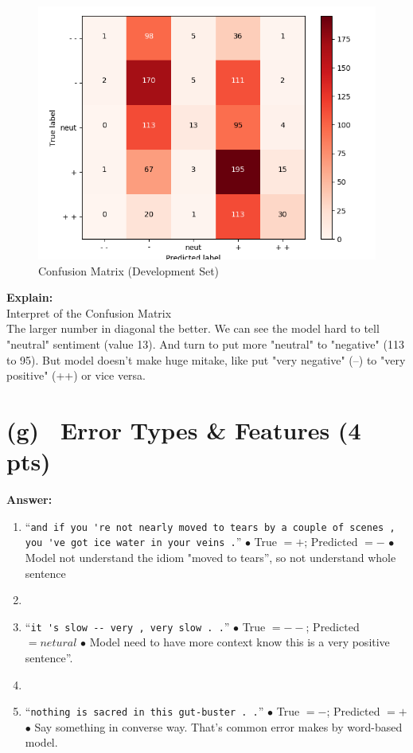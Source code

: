\documentclass[fleqn]{MJD}
\newcommand{\subproblem}[2]{\section{(#1)~ #2}}
\newcommand{\0}{\emptyset}
\begin{document}
\begin{figure}[!htbp]\centering
	\label{figure:confusionmatrix}
	\caption{Confusion Matrix (Development Set)}
	\includegraphics[scale=0.8]{q4_dev_conf.png}
\end{figure}
\noindent \textbf{Explain:}\\
\noindent  Interpret of the Confusion Matrix \\
The larger number in diagonal the better. We can see the model hard to tell "neutral" sentiment (value 13). And turn to put more "neutral" to "negative" (113 to 95). But model doesn't make huge mitake, like put "very negative" (--) to "very positive" (++) or vice versa.



\newpage 

\subproblem{g}{Error Types \& Features (4 pts)}
\noindent \textbf{Answer:} \\

\begin{enumerate}
	\item ``\verb|and if you 're not nearly moved to tears by a couple of scenes ,| \newline \verb|you 've got ice water in your veins .|''
	\subitem $\bullet$ True $= +$; Predicted $= -$
	\subitem $\bullet$ Model not understand the idiom  "moved to tears'', so not understand whole sentence
	\item[] 
	\item ``\verb|it 's slow -- very , very slow . .|''
	\subitem $\bullet$ True $= --$; Predicted $= netural$
	\subitem $\bullet$ Model need to have more context know this is a very positive sentence''.
	\item[]
	\item ``\verb|nothing is sacred in this gut-buster . .|''
	\subitem $\bullet$ True $= -$; Predicted $= +$
	\subitem $\bullet$ Say something in converse way. That's common error makes by word-based model.
\end{enumerate}
\end{document}
